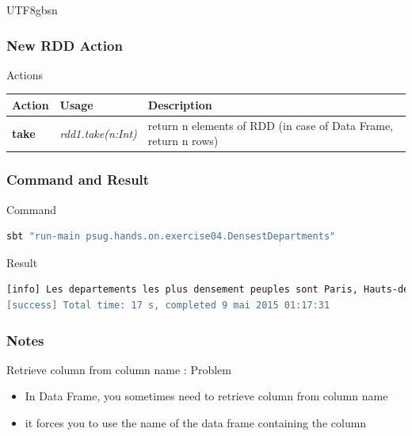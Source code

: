 \documentclass[slidetop,9pt,utf8]{beamer}
\begin{document}
\begin{CJK}{UTF8}{gbsn}
\begin{frame}
\end{frame}

\begin{frame}

  \frametitle{New RDD Action}

  \begin{block}{Actions}
    \begin{center}
      \begin{tabular}{|m{2.1cm}|m{3.5cm}|m{5cm}|}
        \hline 
        \rowcolor{gray} \textbf{Action} & \textbf{Usage} & \textbf{Description} \\ \hline
        \textbf{take} & \textit{rdd1.take(n:Int)} & return n elements of RDD (in case of Data Frame, return n rows) \\ \hline
      \end{tabular}
    \end{center}
  \end{block}

\end{frame}

\begin{frame}[fragile]
  \frametitle{Command and Result}

  \begin{block}{Command}
    \begin{lstlisting}[language=bash, style=terminal-medium]
sbt "run-main psug.hands.on.exercise04.DensestDepartments"
    \end{lstlisting}
  \end{block}

  \begin{block}{Result}
    \begin{lstlisting}[language=bash, style=terminal]
[info] Les departements les plus densement peuples sont Paris, Hauts-de-Seine, Seine-Saint-Denis, Val-de-Marne, Val-d'Oise, Essonne, Yvelines, Rhone, Nord, Bouches-du-Rhone
[success] Total time: 17 s, completed 9 mai 2015 01:17:31
    \end{lstlisting}
  \end{block}

\end{frame}

\begin{frame}[fragile]
  \frametitle{Notes}

  \begin{exampleblock}{Retrieve column from column name : Problem}
    \begin{itemize}
      \item In Data Frame, you sometimes need to retrieve column from column name
      \item it forces you to use the name of the data frame containing the column
    \end{itemize}
  \end{exampleblock}


\end{frame}
\end{CJK}
\end{document}
